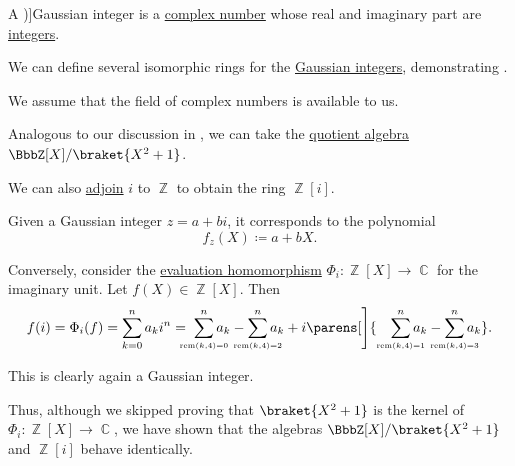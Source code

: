 \begin{definition}\label{def:gaussian_integers}
  A \term[ru=целые гауссовые числа (\cite[example 3.5.1]{Винберг2014Алгебра})]{Gaussian integer} is a \hyperref[def:complex_numbers]{complex number} whose real and imaginary part are \hyperref[def:integers]{integers}.
\end{definition}

\begin{example}\label{ex:gaussian_integers}
  We can define several isomorphic rings for the \hyperref[def:gaussian_integers]{Gaussian integers}, demonstrating .

  We assume that the field of complex numbers is available to us.

  \begin{thmenum}
     Analogous to our discussion in , we can take the \hyperref[def:algebra_over_ring/quotient]{quotient algebra} \( \BbbZ[X] / \braket{X^2 + 1} \).

     We can also \hyperref[def:semiring_adjunction]{adjoin} \( i \) to \( \BbbZ \) to obtain the ring \( \BbbZ[i] \).

    Given a Gaussian integer \( z = a + bi \), it corresponds to the polynomial
    \begin{equation*}
      f_z(X) \coloneqq a + bX.
    \end{equation*}

    Conversely, consider the \hyperref[con:evaluation_homomorphism]{evaluation homomorphism} \( \Phi_i: \BbbZ[X] \to \BbbC \) for the imaginary unit. Let \( f(X) \in \BbbZ[X] \). Then
    \begin{equation*}
      f(i)
      =
      \Phi_i(f)
      =
      \sum_{k=0}^n a_k i^n
      =
      \thickspace \sum_{\scriptscriptstyle{\mathclap{\rem(k, 4) = 0}}}^n a_k - \sum_{\scriptscriptstyle{\mathclap{\rem(k, 4) = 2}}}^n a_k + i \parens[\Bigg]{ \quad \sum_{\scriptscriptstyle{\mathclap{\rem(k, 4) = 1}}}^n a_k - \sum_{\scriptscriptstyle{\mathclap{\rem(k, 4) = 3}}}^n a_k }.
    \end{equation*}

    This is clearly again a Gaussian integer.

    Thus, although we skipped proving that \( \braket{X^2 + 1} \) is the kernel of \( \Phi_i: \BbbZ[X] \to \BbbC \), we have shown that the algebras \( \BbbZ[X] / \braket{ X^2 + 1 } \) and \( \BbbZ[i] \) behave identically.
  \end{thmenum}
\end{example}

